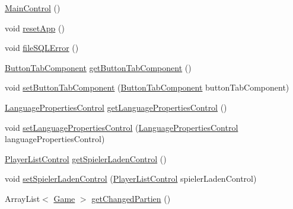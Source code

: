 \begin{DoxyCompactItemize}
\item 
\hyperlink{classde_1_1turnierverwaltung_1_1control_1_1_main_control_a214f2a24e15bb45dbe0d542a43202231}{Main\+Control} ()
\item 
void \hyperlink{classde_1_1turnierverwaltung_1_1control_1_1_main_control_a3f29063883f901353b8a559a00e4a6d4}{reset\+App} ()
\item 
void \hyperlink{classde_1_1turnierverwaltung_1_1control_1_1_main_control_a153df7086cd2bfd16b2181a1f662ed14}{file\+S\+Q\+L\+Error} ()
\item 
\hyperlink{classde_1_1turnierverwaltung_1_1view_1_1_button_tab_component}{Button\+Tab\+Component} \hyperlink{classde_1_1turnierverwaltung_1_1control_1_1_main_control_abaf13dc03782a5a4f72388ee88dc7208}{get\+Button\+Tab\+Component} ()
\item 
void \hyperlink{classde_1_1turnierverwaltung_1_1control_1_1_main_control_a2bbf92d4d774163f3fcea4db110edeaa}{set\+Button\+Tab\+Component} (\hyperlink{classde_1_1turnierverwaltung_1_1view_1_1_button_tab_component}{Button\+Tab\+Component} button\+Tab\+Component)
\item 
\hyperlink{classde_1_1turnierverwaltung_1_1control_1_1_language_properties_control}{Language\+Properties\+Control} \hyperlink{classde_1_1turnierverwaltung_1_1control_1_1_main_control_aab04d56f572e2e86994263daf1e13829}{get\+Language\+Properties\+Control} ()
\item 
void \hyperlink{classde_1_1turnierverwaltung_1_1control_1_1_main_control_a81ac1344e770cfbcba4e593ac2669551}{set\+Language\+Properties\+Control} (\hyperlink{classde_1_1turnierverwaltung_1_1control_1_1_language_properties_control}{Language\+Properties\+Control} language\+Properties\+Control)
\item 
\hyperlink{classde_1_1turnierverwaltung_1_1control_1_1_player_list_control}{Player\+List\+Control} \hyperlink{classde_1_1turnierverwaltung_1_1control_1_1_main_control_a6ba8782caad42a3a0a13541a02a15391}{get\+Spieler\+Laden\+Control} ()
\item 
void \hyperlink{classde_1_1turnierverwaltung_1_1control_1_1_main_control_ad2e5e84f1edd3adf1f6b68fcb63b7346}{set\+Spieler\+Laden\+Control} (\hyperlink{classde_1_1turnierverwaltung_1_1control_1_1_player_list_control}{Player\+List\+Control} spieler\+Laden\+Control)
\item 
Array\+List$<$ \hyperlink{classde_1_1turnierverwaltung_1_1model_1_1_game}{Game} $>$ \hyperlink{classde_1_1turnierverwaltung_1_1control_1_1_main_control_a77925f47e2e9b1ac38a83ca0887bf88a}{get\+Changed\+Partien} ()

\end{DoxyCompactItemize}
